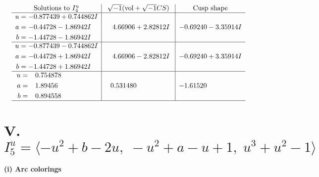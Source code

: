 \documentclass[1p]{elsarticle_modified}
\theoremstyle{definition}
\newcommand{\I}{\sqrt{-1}}
\begin{document}
$$\begin{array}{c|c|c}  
\text{Solutions to }I^u_{4}& \I (\text{vol} + \sqrt{-1}CS) & \text{Cusp shape}\\
 \hline 
\begin{aligned}
u &= -0.877439 + 0.744862 I \\
a &= -0.44728 - 1.86942 I \\
b &= -1.44728 - 1.86942 I\end{aligned}
 & \phantom{-}4.66906 + 2.82812 I & -0.69240 - 3.35914 I \\ \hline\begin{aligned}
u &= -0.877439 - 0.744862 I \\
a &= -0.44728 + 1.86942 I \\
b &= -1.44728 + 1.86942 I\end{aligned}
 & \phantom{-}4.66906 - 2.82812 I & -0.69240 + 3.35914 I \\ \hline\begin{aligned}
u &= \phantom{-}0.754878\phantom{ +0.000000I} \\
a &= \phantom{-}1.89456\phantom{ +0.000000I} \\
b &= \phantom{-}0.894558\phantom{ +0.000000I}\end{aligned}
 & \phantom{-}0.531480\phantom{ +0.000000I} & -1.61520\phantom{ +0.000000I}\\
 \hline 
 \end{array}$$\newpage\newpage\renewcommand{\arraystretch}{1}
\centering \section*{V. $I^u_{5}= \langle - u^2+b-2 u,\;- u^2+a- u+1,\;u^3+u^2-1 \rangle$}
\flushleft \textbf{(i) Arc colorings}\\
\end{document}
